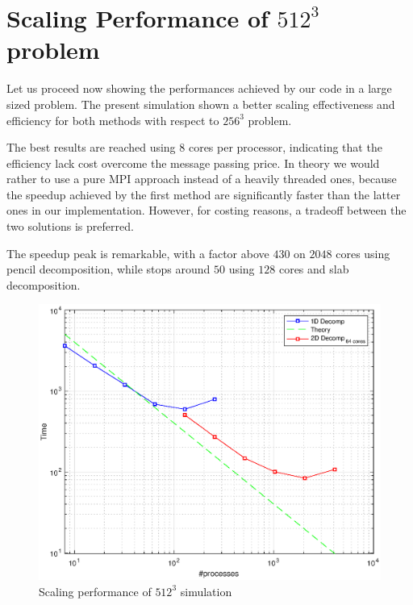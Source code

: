 \section{Scaling Performance of $512^3$ problem}
Let us proceed now showing the performances achieved by our code in a large sized problem.
The present simulation shown a better scaling effectiveness and efficiency for both methods with respect to $256^{3}$ problem. 
\par
The best results are reached using 8 cores per processor, indicating that the efficiency lack cost overcome the message passing price.
In theory we would rather to use a pure MPI approach instead of a heavily threaded ones, because the speedup achieved by the first method are significantly faster than the latter ones in our implementation. However, for costing reasons, a tradeoff between the two solutions is preferred. \\
\par
The speedup peak is remarkable, with a factor above $430$ on $2048$ cores using pencil decomposition, while stops around $50$ using $128$ cores and slab decomposition. \\
\par

\begin{figure}
\begin{center}
\includegraphics[scale=0.6]{grafici/5121}
\caption{Scaling performance of $512^3$ simulation}
\label{5121}
\end{center}
\end{figure}

